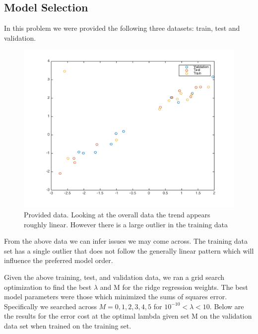 \documentclass[10pt,twocolumn]{article}
\begin{document}
\subsection*{ Model Selection}
In this problem we were provided the following three datasets: train, test and validation. 
\begin{figure}[H]
\center
\includegraphics[scale =.4]{test_train_validate.png}
\caption{Provided data. Looking at the overall data the trend appears roughly linear. However there is a large outlier in the training data}
\end{figure}

From the above data we can infer issues we may come across. The training data set has a single outlier that does not follow the generally linear pattern which will influence the preferred model order. 

Given the above training, test, and validation data, we ran a grid search optimization to find the best $\lambda$ and M for the ridge regression weights. The best model parameters were those which minimized the sums of squares error. Specifically we searched across $M= {0,1,2,3,4,5}$  for $10^{-10} < \lambda <10 $. Below are the results for the error cost at the optimal lambda given set M on the validation data set when trained on the training set. 
\end{document}

